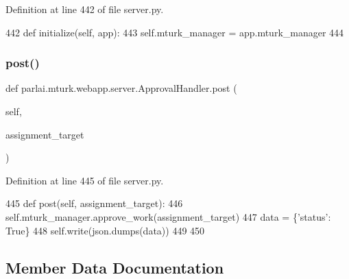 Definition at line 442 of file server.\+py.


\begin{DoxyCode}
442     \textcolor{keyword}{def }initialize(self, app):
443         self.mturk\_manager = app.mturk\_manager
444 
\end{DoxyCode}
\mbox{\label{classparlai_1_1mturk_1_1webapp_1_1server_1_1ApprovalHandler_a94b2c2a69732dde8ea1e92a8b4f5f7ea}} 
\subsubsection{\texorpdfstring{post()}{post()}}
{\footnotesize\ttfamily def parlai.\+mturk.\+webapp.\+server.\+Approval\+Handler.\+post (\begin{DoxyParamCaption}\item[{}]{self,  }\item[{}]{assignment\+\_\+target }\end{DoxyParamCaption})}



Definition at line 445 of file server.\+py.


\begin{DoxyCode}
445     \textcolor{keyword}{def }post(self, assignment\_target):
446         self.mturk\_manager.approve\_work(assignment\_target)
447         data = \{\textcolor{stringliteral}{'status'}: \textcolor{keyword}{True}\}
448         self.write(json.dumps(data))
449 
450 
\end{DoxyCode}


\subsection{Member Data Documentation}
\mbox{\label{classparlai_1_1mturk_1_1webapp_1_1server_1_1ApprovalHandler_ac6cbcc9f89912ecbd3b9c677e44225b1}} 
